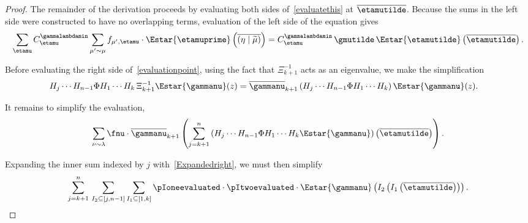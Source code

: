 \begin{proof}The remainder of the derivation proceeds by evaluating both sides of~\eqref{evaluatethis} at $\overline{\etamutilde}$. Because the sums in the left side were constructed to have no overlapping terms, evaluation of the left side of the equation gives
\[ \sum_{\etamu} C^{\gammalambdamin}_{\etamu} \sum_{\mu' \sim \mu} f_{\mu',\etamu} \cdot \Estar{\etamuprime}\left(\overline{(\eta \mid \widetilde{\mu})}\right)= C^{\gammalambdamin}_{\etamu} \, \gmutilde \,\Estar{\etamutilde} \left( \overline{\etamutilde}\right). \]

Before evaluating the right side of~\eqref{evaluationpoint}, using the fact that $\Xi^{-1}_{k+1}$ acts as an eigenvalue, we make the simplification
\begin{align*}
    H_j \dotsm H_{n-1} \Phi H_1 \dotsm H_{k} \, \Xi_{k+1}^{-1}   \Estar{\gammanu}(z) 
    &=\overline{\gammanu}_{k+1} \left( H_j \dotsm H_{n-1} \Phi H_1 \dotsm H_{k} \right)  \Estar{\gammanu}(z).
\end{align*}

It remains to simplify the evaluation,
\begin{equation}\label{unsimplifiedsum} \sum_{\nu \sim \lambda} \fnu \cdot \overline{\gammanu}_{k+1} \left( \sum_{j=k+1}^n   \left( H_j \dotsm H_{n-1} \Phi H_1 \dotsm H_{k} \Estar{\gammanu} \right)\left(\overline{\etamutilde}\right)\right).\end{equation}

Expanding the inner sum indexed by $j$ with~\eqref{Expandedright}, we must then simplify
\[  \sum_{j=k+1}^n \,   \sum_{I_2\subseteq [j, n-1]} \sum_{I_1 \subseteq [1,k]}\pIoneevaluated \cdot \pItwoevaluated \cdot \Estar{\gammanu}\left(I_2\left(I_1\left(\overline{\etamutilde}\right)\right)\right).\]


\end{proof}

